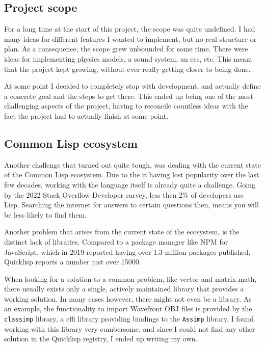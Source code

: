 
\subsection{Project scope}

For a long time at the start of this project,
the scope was quite undefined.
I had many ideas for different features I wanted to implement,
but no real structure or plan.
As a consequence,
the scope grew unbounded for some time.
There were ideas for implementing physics models,
a sound system,
an \ac{ecs}, etc.
This meant that the project kept growing,
without ever really getting closer to being done.

At some point I decided to completely stop with development,
and actually define a concrete goal and the steps to get there.
This ended up being one of the most challenging aspects of the project,
having to reconcile countless ideas with the fact the project had to actually finish at some point.

\subsection{Common Lisp ecosystem}


Another challenge that turned out quite tough,
was dealing with the current state of the Common Lisp ecosystem.
Due to the it having lost popularity over the last few decades,
working with the language itself is already quite a challenge.
Going by the 2022 Stack Overflow Developer survey,
less then 2\% of developers use Lisp.
Searching the internet for answers to certain questions then,
means you will be less likely to find them.

Another problem that arises from the current state of the ecosystem,
is the distinct lack of libraries.
Compared to a package manager like NPM for JavaScript,
which in 2019 reported having over 1.3 million packages published\cite{npm},
Quicklisp reports a number just over 15000\cite{quicklisp}.

When looking for a solution to a common problem,
like vector and matrix math,
there usually exists only a single,
actively maintained library that provides a working solution.
In many cases however,
there might not even be a library.
As an example,
the functionality to import Wavefront OBJ files is provided by the \texttt{classimp} library,
a \ac{cffi} library providing bindings to the \texttt{Assimp} library.
I found working with this library very cumbersome,
and since I could not find any other solution in the Quicklisp registry,
I ended up writing my own.

